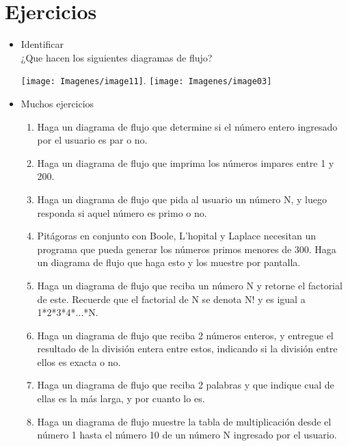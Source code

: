 \section*{Ejercicios}
\begin{itemize}
    \item Identificar\\
        ¿Que hacen los siguientes diagramas de flujo?
          \begin{center}
            \texttt{[image: Imagenes/image11]}.
            \texttt{[image: Imagenes/image03]}
          \end{center}

    \item Muchos ejercicios\\
        \begin{enumerate}
            \item Haga un diagrama de flujo que determine si el número entero ingresado por el usuario es par o no.
            \item Haga un diagrama de flujo que imprima los números impares entre 1 y 200.
            \item Haga un diagrama de flujo que pida al usuario un número N, y luego responda si aquel número es primo o no.
            \item Pitágoras en conjunto con Boole, L’hopital y Laplace necesitan un programa que pueda generar los números primos menores de 300. Haga un diagrama de flujo  que haga esto y los muestre por pantalla.
            \item Haga un diagrama de flujo  que reciba un número N y retorne el factorial de este. Recuerde que el factorial de N se denota N! y es igual a 1*2*3*4*...*N.
            \item Haga un diagrama de flujo que reciba 2 números enteros, y entregue el resultado de la división entera entre estos, indicando si la división entre ellos es exacta o no.
            \item Haga un diagrama de flujo que reciba 2 palabras y que indique cual de ellas es la más larga, y por cuanto lo es.
            \item Haga un diagrama de flujo muestre la tabla de multiplicación desde el número 1 hasta el número 10 de un número N ingresado por el usuario.
        \end{enumerate}
\end{itemize}
